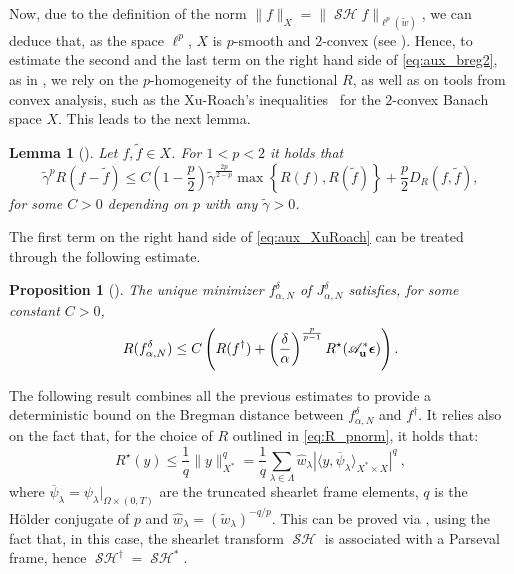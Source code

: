 \documentclass[11pt,a4paper]{article}
\numberwithin{equation}{section}
\newtheorem{lemma}[theorem]{Lemma}
\newtheorem{proposition}[theorem]{Proposition}
\DeclareMathOperator{\sh}{\mathcal{SH}}
\renewcommand{\vec}[1]{\boldsymbol{#1}} %
\newcommand{\bu}{{\bf u}}
\newcommand{\be}{{\vec{\epsilon}}}
\newcommand{\cAbu}{\mathscr{A}_{\bu}}
\def\fdan{f^\delta_{\alpha,N}}
\def\Jdan{J^\delta_{\alpha,N}}
\begin{document}
Now, due to the definition of the norm $ \| f \|_{X} = \| \sh f \|_{\ell^p(\tilde{w})}$, we can deduce that, as the space $\ell^p$, $X$ is $p$-smooth and $2$-convex (see \cite[Definitions 2.32-2.33]{schuster2012regularization}).
Hence, to estimate the second and the last term on the right hand side of \eqref{eq:aux_breg2}, as in \cite[Section 4]{bubba2021}, we rely on the $p$-homogeneity of the functional $R$, as well as on tools from convex analysis, such as the Xu-Roach's inequalities~\cite{Xu91} for the $2$-convex Banach space $X$. This leads to the next lemma.
\begin{lemma}[{\cite[Lemma 4.1]{bubba2021}}]
\label{lem:xuroach}
Let $f,\tilde f\in X$. For $1<p<2$ it holds that
\begin{equation}
\label{eq:aux_XuRoach}
	\widetilde{\gamma}^p R(f-\tilde f) \leq C \left(1-\frac p2\right) \widetilde{\gamma}^{\frac{2p}{2-p}} \max\left\{R(f), R(\tilde f)\right\} + \frac p2 D_R(f,\tilde f),
\end{equation}
for some $C>0$ depending on $p$ with any $\widetilde{\gamma}>0$.
\end{lemma}
The first term on the right hand side of \eqref{eq:aux_XuRoach} can be treated through the following %
estimate.
\begin{proposition}[{\cite[Proposition 3.1, second estimate]{bubba2021}}]
\label{prop:apriori}
The unique minimizer $\fdan$ of $\Jdan$ satisfies, for some constant $C>0$,
\begin{equation}
\label{eq:apriori2}
	R(\fdan) \leq C\left(R(f^\dag) + \left(\frac{\delta}\alpha\right)^{\frac{p}{p-1}} R^\star( \cAbu^* \be)\right).
\end{equation}
\end{proposition}

The following result combines all the previous estimates to provide a deterministic bound on the Bregman distance between $\fdan$ and $f^{\dag}$. It relies also on the fact that, for the choice of $R$ outlined in \eqref{eq:R_pnorm}, it holds  that:
\begin{equation} \label{eq:R_star}
    R^\star(y) \leq \frac{1}{q} \| y \|_{X^*}^q = \frac{1}{q} \sum_{\lambda \in \Lambda} \hat{w}_\lambda|\langle y,\overline{\psi}_\lambda\rangle_{X^*\times X}|^q \ ,
\end{equation}
where $\overline{\psi}_\lambda = \psi_\lambda|_{\Omega \times (0,T)}$ are the truncated shearlet frame elements, $q$ is the H\"{o}lder conjugate of $p$ and $\hat{w}_\lambda = (\tilde{w}_\lambda)^{-q/p}$. This can be proved via \cite[Proposition 4.1]{bubba2021}, using the fact that, in this case, the shearlet transform $\sh$ is associated with a Parseval frame, hence $\sh ^\dag = \sh ^*$.
\end{document}
